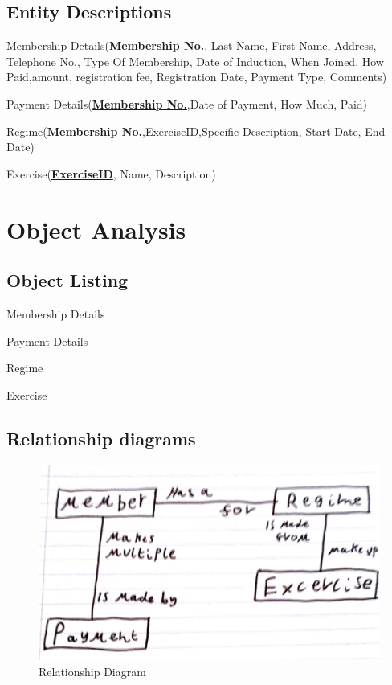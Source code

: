 \subsection{Entity Descriptions}

Membership Details(\textbf{\underline{Membership No.}}, Last Name, First Name, Address, Telephone No., Type Of Membership, Date of Induction, When Joined, How Paid,amount, registration fee, Registration Date, Payment Type, Comments)

Payment Details(\textbf{\underline{Membership No.}},Date of Payment, How Much, Paid)

Regime(\textbf{\underline{Membership No.}},ExerciseID,Specific Description, Start Date, End Date)

Exercise(\textbf{\underline{ExerciseID}}, Name, Description)

\section{Object Analysis}

\subsection{Object Listing}

Membership Details

Payment Details

Regime

Exercise

\subsection{Relationship diagrams}

\begin{figure}[H]
    \includegraphics[width=\textwidth]{RelationshipDiagram.jpg}
    \caption{Relationship Diagram} \label{fig: Relationship Diagram}
\end{figure}

